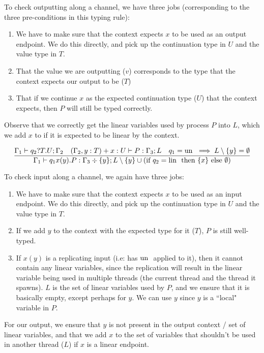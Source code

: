 To check outputting along a channel, we have three jobs (corresponding to the three pre-conditions in this typing rule):
\begin{enumerate}
    \item We have to make sure that the context expects $x$ to be used as an output endpoint. We do this directly, and pick up the continuation type in $U$ and the value type in $T$.
    \item That the value we are outputting ($v$) corresponds to the type that the context expects our output to be ($T$)
    \item That if we continue $x$ as the expected continuation type ($U$) that the context expects, then $P$ will still be typed correctly.
\end{enumerate}

Observe that we correctly get the linear variables used by process $P$ into $L$, which we add $x$ to if it is expected to be linear by the context.

$$
\frac{\Gamma_1 \vdash q_2?T.U ; \Gamma_2 \quad (\Gamma_2, y : T) + x : U \vdash P : \Gamma_3 ; L \quad q_1 = \text{un } \implies L \setminus \{y\} = \emptyset}{\Gamma_1 \vdash q_1 x(y) . P : \Gamma_3 \div \{y\} ; L \setminus \{y\} \cup  (\text{if } q_2 = \text{lin } \text{ then } \{x\} \text{ else } \emptyset)}
$$

To check input along a channel, we again have three jobs:
\begin{enumerate}
    \item We have to make sure that the context expects $x$ to be used as an input endpoint. We do this directly, and pick up the continuation type in $U$ and the value type in $T$.
    \item If we add $y$ to the context with the expected type for it ($T$), $P$ is still well-typed. 
    \item If $x(y)$ is a replicating input (i.e: has $\text{un }$ applied to it), then it cannot contain any linear variables, since the replication will result in the linear variable being used in multiple threads (the current thread and the thread it spawns). $L$ is the set of linear variables used by $P$, and we ensure that it is basically empty, except perhaps for $y$. We can use $y$ since $y$ is a ``local" variable in $P$.
\end{enumerate}

For our output, we ensure that $y$ is not present in the output context / set of linear variables, and that we add $x$ to the set of variables that shouldn't be used in another thread ($L$) if $x$ is a linear endpoint.

